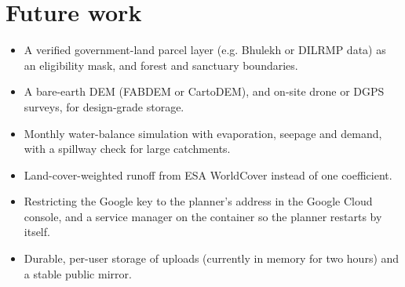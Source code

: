 \documentclass[11pt,a4paper]{article}
\begin{document}
\section{Future work}
\begin{itemize}
\item A verified government-land parcel layer (e.g. Bhulekh or DILRMP data) as an eligibility mask, and forest and sanctuary boundaries.
\item A bare-earth DEM (FABDEM or CartoDEM), and on-site drone or DGPS surveys, for design-grade storage.
\item Monthly water-balance simulation with evaporation, seepage and demand, with a spillway check for large catchments.
\item Land-cover-weighted runoff from ESA WorldCover instead of one coefficient.
\item Restricting the Google key to the planner's address in the Google Cloud console, and a service manager on the container so the planner restarts by itself.
\item Durable, per-user storage of uploads (currently in memory for two hours) and a stable public mirror.
\end{itemize}

\end{document}
